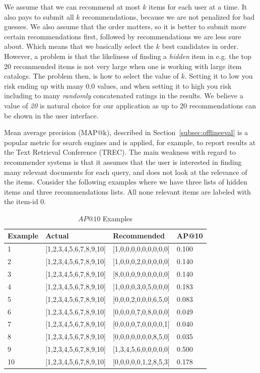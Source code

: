 We assume that we can recommend at most $k$ items for each user at a time. It also pays to submit all $k$
recommendations, because we are not penalized for bad guesses. We also assume that the order matters, so it
is better to submit more certain recommendations first, followed by recommendations we are less sure about.
Which means that we basically select the $k$ best candidates in order.
However, a problem is that the likeliness of finding a \emph{hidden} item in e.g. the top 20 recommended items
is not very large when one is working with large item catalogs. The problem then, is how to select the value of $k$.
Setting it to low you risk ending up with many $0.0$ values, and when setting it to high you risk including to many
\emph{randomly} concatenated ratings in the results. We believe a value of \textit{20} is natural choice for our
application as up to 20 recommendations can be shown in the user interface.

Mean average precision (MAP@k), described in Section~\ref{subsec:offlineeval} is a popular metric for search
engines and is applied, for example, to report results at the Text Retrieval Conference (TREC). The main weakness with regard
to recommender systems is that it assumes that the user is interested in finding many relevant documents for each query, and
does not look at the relevance of the items. Consider the following examples where we have three lists of hidden items and
three recommendations lists. All none relevant items are labeled with the item-id $0$.

\begin{table}[H]
\label{table:ap}
\centering
\begin{tabular}{*{4}l}
\toprule
Example 	& 	Actual					& 	Recommended					&	AP@10   \\ \midrule
1			& [1,2,3,4,5,6,7,8,9,10]	&	[1,0,0,0,0,0,0,0,0,0]		&	0.100  \\
2			& [1,2,3,4,5,6,7,8,9,10]	&	[1,0,0,0,2,0,0,0,0,0]		&	0.140  \\
3			& [1,2,3,4,5,6,7,8,9,10]	&	[8,0,0,0,9,0,0,0,0,0]		&	0.140  \\
4			& [1,2,3,4,5,6,7,8,9,10]	&	[1,0,0,0,3,0,5,0,0,0]		&	0.183  \\
5			& [1,2,3,4,5,6,7,8,9,10]	&	[0,0,0,2,0,0,0,6,5,0]		&	0.083  \\
6			& [1,2,3,4,5,6,7,8,9,10]	&	[0,0,0,0,7,0,8,0,0,0]		&	0.049  \\
7			& [1,2,3,4,5,6,7,8,9,10]	&	[0,0,0,0,7,0,0,0,0,1]		&	0.040  \\
8			& [1,2,3,4,5,6,7,8,9,10]	&	[0,0,0,0,0,0,0,8,5,0]		&	0.035  \\
9			& [1,2,3,4,5,6,7,8,9,10]	&	[1,3,4,5,6,0,0,0,0,0]		&	0.500  \\
10			& [1,2,3,4,5,6,7,8,9,10]	&	[0,0,0,0,0,1,2,8,5,3]		&	0.178  \\
\bottomrule
\end{tabular}
\caption{$AP@10$ Examples}
\end{table}

